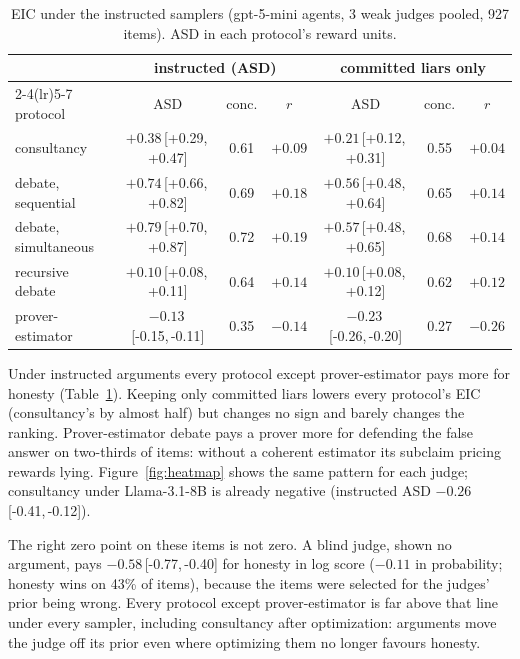 \documentclass[11pt]{article}
\newcommand{\ci}[2]{\,[#1,\,#2]}
\begin{document}
\begin{table}[t]
\centering\small
\caption{EIC under the instructed samplers (gpt-5-mini agents, 3 weak judges pooled, 927 items). ASD in each
protocol's reward units.}
\label{tab:instructed}
\setlength{\tabcolsep}{4pt}\footnotesize
\begin{tabular}{lcccccc}
\toprule
& \multicolumn{3}{c}{instructed (ASD)} & \multicolumn{3}{c}{committed liars only} \\
\cmidrule(lr){2-4}\cmidrule(lr){5-7}
protocol & ASD & conc. & $r$ & ASD & conc. & $r$ \\
\midrule
consultancy & $+0.38$\ci{+0.29}{+0.47} & 0.61 & $+0.09$ & $+0.21$\ci{+0.12}{+0.31} & 0.55 & $+0.04$ \\
debate, sequential & $+0.74$\ci{+0.66}{+0.82} & 0.69 & $+0.18$ & $+0.56$\ci{+0.48}{+0.64} & 0.65 & $+0.14$ \\
debate, simultaneous & $+0.79$\ci{+0.70}{+0.87} & 0.72 & $+0.19$ & $+0.57$\ci{+0.48}{+0.65} & 0.68 & $+0.14$ \\
recursive debate & $+0.10$\ci{+0.08}{+0.11} & 0.64 & $+0.14$ & $+0.10$\ci{+0.08}{+0.12} & 0.62 & $+0.12$ \\
prover-estimator & $-0.13$\ci{-0.15}{-0.11} & 0.35 & $-0.14$ & $-0.23$\ci{-0.26}{-0.20} & 0.27 & $-0.26$ \\
\bottomrule
\end{tabular}
\end{table}

Under instructed arguments every protocol except prover-estimator pays more for honesty
(Table~\ref{tab:instructed}). Keeping only committed liars lowers every protocol's EIC (consultancy's by almost
half) but changes no sign and barely changes the ranking. Prover-estimator debate pays a prover more for defending
the false answer on two-thirds of items: without a coherent estimator its subclaim pricing rewards lying.
Figure~\ref{fig:heatmap} shows the same pattern for each judge; consultancy under Llama-3.1-8B is already negative
(instructed ASD $-0.26$\ci{-0.41}{-0.12}).

The right zero point on these items is not zero. A blind judge, shown no argument, pays $-0.58$\ci{-0.77}{-0.40}
for honesty in log score ($-0.11$ in probability; honesty wins on 43\% of items), because the items were selected for
the judges' prior being wrong. Every protocol except prover-estimator is far above that line under every sampler,
including consultancy after optimization: arguments move the judge off its prior even where optimizing them no
longer favours honesty.
\end{document}
